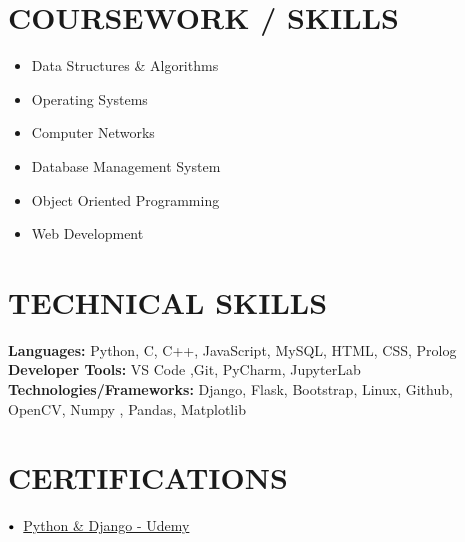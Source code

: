 \documentclass[letterpaper,11pt]{article}
\newcommand{\resumeSubHeadingListStart}{\begin{itemize}[leftmargin=0.0in, label={}]}
\newcommand{\resumeSubHeadingListEnd}{\end{itemize}}
\newcommand\sbullet[1][.5]{\mathbin{\vcenter{\hbox{\scalebox{#1}{$\bullet$}}}}}
\begin{document}
\section{COURSEWORK / SKILLS}
        \begin{multicols}{3}
            \begin{itemize}[itemsep=-3pt, parsep=5pt]
                \item Data Structures \& Algorithms
                \item Operating Systems
                \item Computer Networks
                \item Database Management System 
                \item Object Oriented Programming
                \item Web Development
            \end{itemize}
        \end{multicols}
        \vspace*{2.0\multicolsep}

\vspace{0.1cm}

\section{TECHNICAL SKILLS}
 \begin{itemize}[leftmargin=0.15in, label={}]
    \small{\item{
     \textbf{\normalsize{Languages:}}{ \normalsize{Python, C, C++, JavaScript, MySQL, HTML, CSS, Prolog}} \\
     \textbf{\normalsize{Developer Tools:}}{ \normalsize{VS Code ,Git, PyCharm, JupyterLab}} \\
     \textbf{\normalsize{Technologies/Frameworks:}}{\normalsize{ Django, Flask, Bootstrap, Linux, Github, OpenCV, Numpy , Pandas, Matplotlib}} \\
    }}
 \end{itemize}
 \vspace{-15pt}


 
\section{CERTIFICATIONS}


$\sbullet[.75] \hspace{0.1cm}$ {\href{certificateLink.com}{Python \& Django - Udemy}} \hspace{1.6cm}
\end{document}
